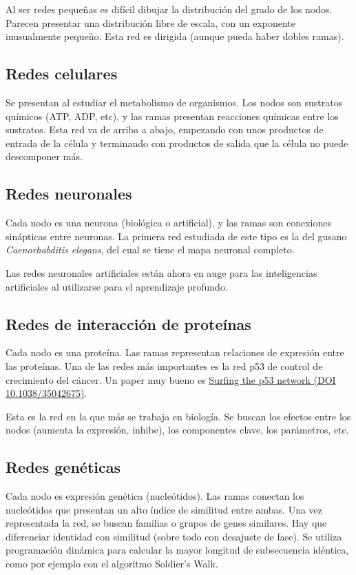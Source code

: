 Al ser redes pequeñas es difícil dibujar la distribución del grado de los nodos. Parecen presentar una distribución libre de escala, con un exponente inusualmente pequeño. Esta red es dirigida (aunque pueda haber dobles ramas). 

\subsection{Redes celulares}
Se presentan al estudiar el metabolismo de organismos. Los nodos son sustratos químicos (ATP, ADP, etc), y las ramas presentan reacciones químicas entre los sustratos. Esta red va de arriba a abajo, empezando con unos productos de entrada de la célula y terminando con productos de salida que la célula no puede descomponer más. 

\subsection{Redes neuronales}
Cada nodo es una neurona (biológica o artificial), y las ramas son conexiones sinápticas entre neuronas. La primera red estudiada de este tipo es la del gusano \textit{Caenorhabditis elegans}, del cual se tiene el mapa neuronal completo.

Las redes neuronales artificiales están ahora en auge para las inteligencias artificiales al utilizarse para el aprendizaje profundo.

\subsection{Redes de interacción de proteínas}
Cada nodo es una proteína. Las ramas representan relaciones de expresión entre las proteínas. Una de las redes más importantes es la red p53 de control de crecimiento del cáncer. Un paper muy bueno es \href{https://www.nature.com/articles/35042675}{Surfing the p53 network (DOI 10.1038/35042675)}.

Esta es la red en la que más se trabaja en biología. Se buscan los efectos entre los nodos (aumenta la expresión, inhibe), los componentes clave, los parámetros, etc. 

\subsection{Redes genéticas}
Cada nodo es expresión genética (nucleótidos). Las ramas conectan los nucleótidos que presentan un alto índice de similitud entre ambas. Una vez representada la red, se buscan familias o grupos de genes similares. Hay que diferenciar identidad con similitud (sobre todo con desajuste de fase). Se utiliza programación dinámica para calcular la mayor longitud de subsecuencia idéntica, como por ejemplo con el algoritmo Soldier's Walk. 

